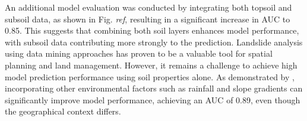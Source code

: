 An additional model evaluation was conducted by integrating both topsoil and subsoil data, as shown in Fig. \textit{ref}, resulting in a significant increase in AUC to 0.85. This suggests that combining both soil layers enhances model performance, with subsoil data contributing more strongly to the prediction. Landslide analysis using data mining approaches has proven to be a valuable tool for spatial planning and land management. However, it remains a challenge to achieve high model prediction performance using soil properties alone. As demonstrated by \cite{b7}, incorporating other environmental factors such as rainfall and slope gradients can significantly improve model performance, achieving an AUC of 0.89, even though the geographical context differs.

